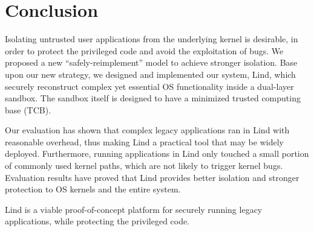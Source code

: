 \section{Conclusion}
\label{sec.conclusion}


Isolating untrusted user applications from the underlying kernel is desirable, in order to protect the privileged code and 
avoid the exploitation of bugs. We proposed a new ``safely-reimplement'' model to achieve stronger isolation. 
Base upon our new strategy, we designed and implemented our system, Lind, which securely reconstruct complex 
yet essential OS functionality inside a dual-layer sandbox. The sandbox itself is designed to 
have a minimized trusted computing base (TCB). 

Our evaluation has shown that complex legacy applications ran in Lind with reasonable overhead, 
thus making Lind a practical tool that may be widely deployed. 
Furthermore, running applications in Lind only touched a small portion of commonly used kernel paths, 
which are not likely to trigger kernel bugs. Evaluation results have proved that Lind provides 
better isolation and stronger protection to OS kernels and the entire system.  

Lind is a viable proof-of-concept platform for securely running legacy applications, while protecting the privileged code.